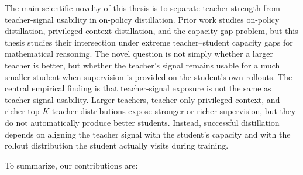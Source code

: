 The main scientific novelty of this thesis is to separate teacher strength from teacher-signal usability in on-policy distillation. Prior work studies on-policy distillation, privileged-context distillation, and the capacity-gap problem, but this thesis studies their intersection under extreme teacher--student capacity gaps for mathematical reasoning. The novel question is not simply whether a larger teacher is better, but whether the teacher's signal remains usable for a much smaller student when supervision is provided on the student's own rollouts. The central empirical finding is that teacher-signal exposure is not the same as teacher-signal usability. Larger teachers, teacher-only privileged context, and richer top-$K$ teacher distributions expose stronger or richer supervision, but they do not automatically produce better students. Instead, successful distillation depends on aligning the teacher signal with the student's capacity and with the rollout distribution the student actually visits during training.

To summarize, our contributions are:

